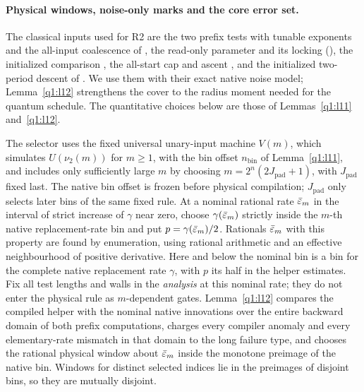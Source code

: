 \paragraph{Physical windows, noise-only marks and the core error set.}

The classical inputs used for R2 are the two prefix tests with tunable exponents and the all-input coalescence of \cite[Lemmas~\ref*{cl:lem:receiver-mixing} and~\ref*{cl:lem:stripes}]{DMNoise1D2026}, the read-only parameter and its locking (\cite[Section~\ref*{cl:sec:parameter} and Lemma~\ref*{cl:lem:locking}]{DMNoise1D2026}), the initialized comparison \cite[Lemma~\ref*{cl:lem:past}]{DMNoise1D2026}, the all-start cap and ascent \cite[Lemmas~\ref*{cl:lem:cap-cut} and~\ref*{cl:lem:ascent}]{DMNoise1D2026}, and the initialized two-period descent of \cite[Lemma~\ref*{cl:lem:two-period}]{DMNoise1D2026}. We use them with their exact native noise model; Lemma~\ref{q1:l12} strengthens the cover to the radius moment needed for the quantum schedule. The quantitative choices below are those of Lemmas~\ref{q1:l11} and~\ref{q1:l12}.

The selector uses the fixed universal unary-input machine \(V(m)\), which simulates \(U(\nu_2(m))\) for \(m\ge1\), with the bin offset \(n_{\mathrm{bin}}\) of Lemma~\ref{q1:l11}, and includes only sufficiently large \(m\) by choosing \(m=2^n(2J_{\mathrm{pad}}+1)\), with \(J_{\mathrm{pad}}\) fixed last. The native bin offset is frozen before physical compilation; \(J_{\mathrm{pad}}\) only selects later bins of the same fixed rule. At a nominal rational rate \(\bar{\varepsilon}_m\) in the interval of strict increase of \(\gamma\) near zero, choose \(\gamma(\bar{\varepsilon}_m)\) strictly inside the \(m\)-th native replacement-rate bin and put \(p=\gamma(\bar{\varepsilon}_m)/2\). Rationals \(\bar{\varepsilon}_m\) with this property are found by enumeration, using rational arithmetic and an effective neighbourhood of positive derivative. Here and below the nominal bin is a bin for the complete native replacement rate \(\gamma\), with \(p\) its half in the helper estimates. Fix all test lengths and walls in the \emph{analysis} at this nominal rate; they do not enter the physical rule as \(m\)-dependent gates. Lemma~\ref{q1:l12} compares the compiled helper with the nominal native innovations over the entire backward domain of both prefix computations, charges every compiler anomaly and every elementary-rate mismatch in that domain to the long failure type, and chooses the rational physical window about \(\bar{\varepsilon}_m\) inside the monotone preimage of the native bin. Windows for distinct selected indices lie in the preimages of disjoint bins, so they are mutually disjoint.

